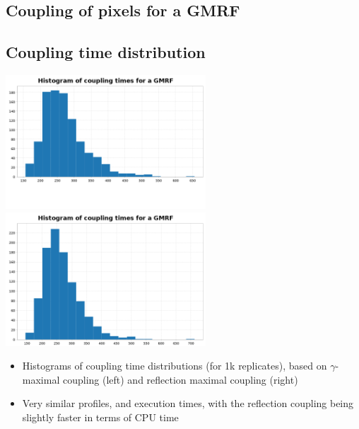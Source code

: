 \documentclass[11pt,a4paper]{article}
\begin{document}
  \subsection{Coupling of pixels for a GMRF}


  \subsection{Coupling time distribution}
\centerline{\includegraphics[height=5cm]{figs/histogram-150-gmc}
  \includegraphics[height=5cm]{figs/histogram-150-rmc}}
\begin{itemize}
\item Histograms of coupling time distributions (for 1k replicates), based on $\gamma$-maximal coupling (left) and reflection maximal coupling (right)
  \item Very similar profiles, and execution times, with the reflection coupling being slightly faster in terms of CPU time
  \end{itemize}
\end{document}
